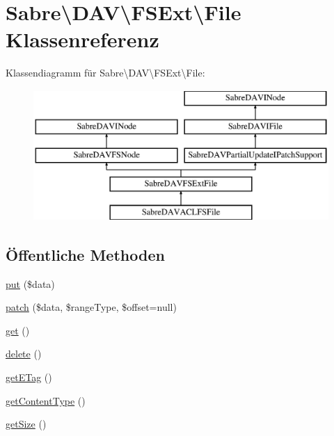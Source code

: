 \hypertarget{class_sabre_1_1_d_a_v_1_1_f_s_ext_1_1_file}{}\section{Sabre\textbackslash{}D\+AV\textbackslash{}F\+S\+Ext\textbackslash{}File Klassenreferenz}
\label{class_sabre_1_1_d_a_v_1_1_f_s_ext_1_1_file}
Klassendiagramm für Sabre\textbackslash{}D\+AV\textbackslash{}F\+S\+Ext\textbackslash{}File\+:\begin{figure}[H]
\begin{center}
\leavevmode
\includegraphics[height=5.000000cm]{class_sabre_1_1_d_a_v_1_1_f_s_ext_1_1_file}
\end{center}
\end{figure}
\subsection*{Öffentliche Methoden}
\begin{DoxyCompactItemize}
\item 
\mbox{\hyperlink{class_sabre_1_1_d_a_v_1_1_f_s_ext_1_1_file_a9316801851d810c25873c2f895d6d3f5}{put}} (\$data)
\item 
\mbox{\hyperlink{class_sabre_1_1_d_a_v_1_1_f_s_ext_1_1_file_a41eb62da489973b1da84e5957c662103}{patch}} (\$data, \$range\+Type, \$offset=null)
\item 
\mbox{\hyperlink{class_sabre_1_1_d_a_v_1_1_f_s_ext_1_1_file_a80f50ccff4fdf801c1a531ec4c62975f}{get}} ()
\item 
\mbox{\hyperlink{class_sabre_1_1_d_a_v_1_1_f_s_ext_1_1_file_a836db6b4a8216778cc4a19a2025eaf17}{delete}} ()
\item 
\mbox{\hyperlink{class_sabre_1_1_d_a_v_1_1_f_s_ext_1_1_file_a9230f17550bcc13aac15429e356280e1}{get\+E\+Tag}} ()
\item 
\mbox{\hyperlink{class_sabre_1_1_d_a_v_1_1_f_s_ext_1_1_file_a0a37951c9e67dde2cd9c33c67015614d}{get\+Content\+Type}} ()
\item 
\mbox{\hyperlink{class_sabre_1_1_d_a_v_1_1_f_s_ext_1_1_file_aec3768804d387a073610838d89bff5c9}{get\+Size}} ()
\end{DoxyCompactItemize}
